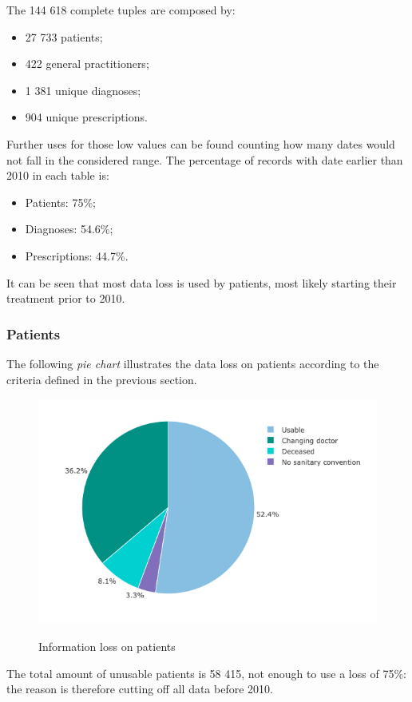 The 144 618 complete tuples are composed by:
\begin{itemize}
	\item 27 733 patients;
	\item 422 general practitioners;
	\item 1 381 unique diagnoses;
	\item 904 unique prescriptions.
\end{itemize}

Further uses for those low values can be found counting how many dates would not fall in the considered range. The percentage of records with date earlier than 2010 in each table is:
\begin{itemize}
	\item Patients: 75\%;
	\item Diagnoses: 54.6\%;
	\item Prescriptions: 44.7\%.
\end{itemize}

It can be seen that most data loss is used by patients, most likely starting their treatment prior to 2010.

\subsubsection{Patients}
The following \textit{pie chart} illustrates the data loss on patients according to the criteria defined in the previous section.
\begin{figure}[h]
	\centering
	\includegraphics[scale=0.6]{images/patients-pie-1.png}
	\label{patientspie}
	\caption{\small Information loss on patients}
\end{figure}

The total amount of unusable patients is 58 415, not enough to use a loss of 75\%: the reason is therefore cutting off all data before 2010.

